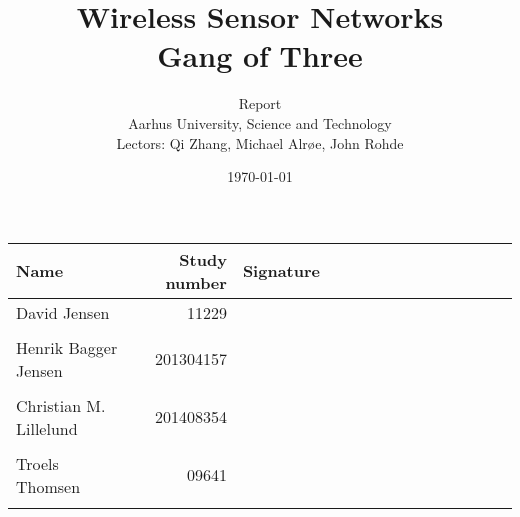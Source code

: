 \documentclass[a4paper,11pt,oneside]{memoir}
\title{Wireless Sensor Networks \\ Gang of Three}
\author{Report \\ Aarhus University, Science and Technology \\ Lectors: Qi Zhang, Michael Alrøe, John Rohde }
\date{\today}
\begin{document}
\fancyhf{} %
\frontmatter
\maketitle
\vfill



\begin{table} [h]
	\centering
	\begin{tabular}{|l|r|l|}
		\hline 
		\textbf{Name} 				& \textbf{Study number} & \textbf{Signature~~~~~~~~~~~~~~~~~~~~} 	\\ \hline
		David Jensen 				& 11229 	& \\ && 												\\ \hline
		Henrik Bagger Jensen 		& 201304157 & \\ && 												\\ \hline
		Christian M. Lillelund 		& 201408354 & \\ && 												\\ \hline
		Troels Thomsen 				& 09641		& \\ && 												\\ \hline
		
	\end{tabular}
\end{table}

\clearpage
\pagestyle{plain}

\tableofcontents

\vfill

\mainmatter
\pagestyle{fancy}
\fancyhf{} %
\fancyhead[CO]{\nouppercase{\leftmark}}
\fancyfoot[CE]{\nouppercase{\rightmark}}
\fancyfoot[RO]{\thepage}

\begin{multicols}{2}
								    \clearpage
												\clearpage
								\clearpage
						\clearpage
											\clearpage
								        \clearpage
										\clearpage
									\clearpage
									\clearpage
\end{multicols}
\end{document}
